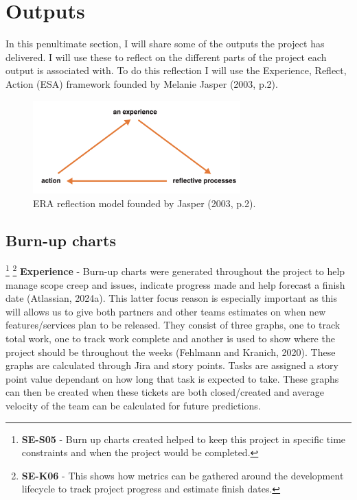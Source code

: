 \section{Outputs}
  In this penultimate section, I will share some of the outputs the project has delivered. I will use these to reflect on the different parts of the project
  each output is associated with. To do this reflection I will use the Experience, Reflect, Action (ESA) framework founded by Melanie Jasper (2003, p.2).

  \begin{figure}[H]
    \centering
    \includegraphics[width=8cm]{assets/eraReflection.png}
    \caption{ERA reflection model founded by Jasper (2003, p.2).}
    \label{fig:eraReflection}
  \end{figure}  

  \subsection{Burn-up charts}
  \label{sec:burnup}
  
  \footnote{\textbf{SE-S05} - Burn up charts created helped to keep this project in specific time constraints and when the project would be completed.}
  \footnote{\textbf{SE-K06} - This shows how metrics can be gathered around the development lifecycle to track project progress and estimate finish dates.}
  \textbf{Experience} - Burn-up charts were generated throughout the project to help manage scope creep and issues, indicate progress made and help
  forecast a finish date (Atlassian, 2024a). This latter focus reason is especially important as this will allows us to give both partners and other 
  teams estimates on when new features/services plan to be released. They consist of three graphs, one to track total work, one to track work complete 
  and another is used to show where the project should be throughout the weeks (Fehlmann and Kranich, 2020). These graphs are calculated through Jira 
  and story points. Tasks are assigned a story point value dependant on how long that task is expected to take. These graphs can then be created when 
  these tickets are both closed/created and average velocity of the team can be calculated for future predictions.


